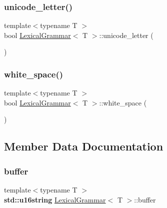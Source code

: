 \mbox{\label{class_lexical_grammar_aee36e7e578912a00215f3a66778c191f}} 
\subsubsection{\texorpdfstring{unicode\+\_\+letter()}{unicode\_letter()}}
{\footnotesize\ttfamily template$<$typename T $>$ \\
bool \hyperlink{class_lexical_grammar}{Lexical\+Grammar}$<$ T $>$\+::unicode\+\_\+letter (\begin{DoxyParamCaption}{ }\end{DoxyParamCaption})\hspace{0.3cm}{\ttfamily [inline]}}

\mbox{\label{class_lexical_grammar_aa8d7fdc84e7ca55c85c67b2849e89ac2}} 
\subsubsection{\texorpdfstring{white\+\_\+space()}{white\_space()}}
{\footnotesize\ttfamily template$<$typename T $>$ \\
bool \hyperlink{class_lexical_grammar}{Lexical\+Grammar}$<$ T $>$\+::white\+\_\+space (\begin{DoxyParamCaption}{ }\end{DoxyParamCaption})\hspace{0.3cm}{\ttfamily [inline]}}



\subsection{Member Data Documentation}
\mbox{\label{class_lexical_grammar_af23cc1b7472da117c7e39a8b8fe45e04}} 
\subsubsection{\texorpdfstring{buffer}{buffer}}
{\footnotesize\ttfamily template$<$typename T $>$ \\
\textbf{ std\+::u16string} \hyperlink{class_lexical_grammar}{Lexical\+Grammar}$<$ T $>$\+::buffer}

